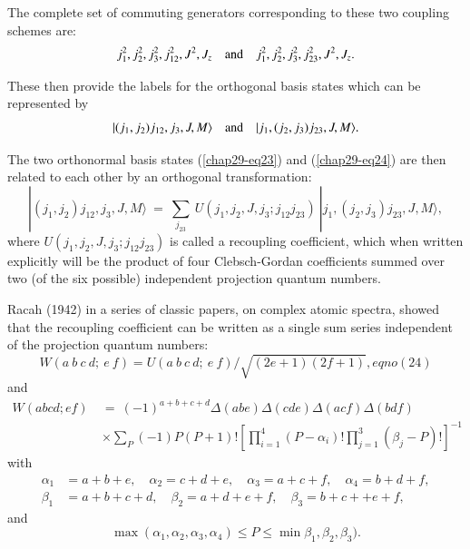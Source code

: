 The complete set of commuting generators corresponding to these two coupling schemes are:
\begin{equation}
j_1^2, j_2^2,j_3^2,j_{12}^2,J^2,J_z\quad {\rm and}\quad j_1^2, j_2^2,j_3^2,j_{23}^2,J^2,J_z. \label{chap29-eq23}
\end{equation}

These then provide the labels for the orthogonal basis states which can be represented by 
\begin{equation}
|(j_1,j_2)j_{12}, j_3, J, M\rangle  \quad {\rm and} \quad |j_1,(j_2,j_3)j_{23}, J, M\rangle. \label{chap29-eq24}
\end{equation}

The two orthonormal basis states (\eqref{chap29-eq23}) and (\eqref{chap29-eq24}) are then related to each other by an orthogonal transformation:
\begin{equation}
|(j_1,j_2)j_{12}, j_3, J, M\rangle \ =\ \sum_{j_{23}} \ U(j_1,j_2,J,j_3; j_{12}j_{23})\ |j_1,(j_2,j_3)j_{23}, J, M\rangle, \label{chap29-eq25}
\end{equation}
where $U(j_1,j_2,J,j_3; j_{12}j_{23})$ is called a recoupling coefficient, which when written explicitly will be the product of four Clebsch-Gordan coefficients summed over two (of the six possible) independent projection quantum numbers.

Racah (1942) in a series of classic papers, on complex atomic spectra, showed that the recoupling coefficient can be written as a single sum series independent of the projection quantum numbers:
\begin{equation*}
W(a\ b\ c\ d;\ e\ f) =  U(a\ b\ c\ d;\ e\ f) / \sqrt{(2e+1)(2f+1)}, eqno(24)
\end{equation*}
and
\begin{equation*}
\begin{split}
W(abcd;ef)\ & =\ (-1)^{a+b+c+d} \Delta(abe)\Delta(cde)\Delta(acf)\Delta(bdf) \\
 & \times\sum_P(-1)P (P+1)!\left[ \prod_{i=1}^4 (P-\alpha_i)! \prod_{j=1}^3 (\beta_j-P)! \right]^{-1} \label{chap29-eq25a}
\end{split}
\end{equation*}
with
\begin{equation}
\begin{split}
\alpha_1 & = a+b+e,\quad \alpha_2 = c+d+e, \quad \alpha_3 = a+c+f,\quad \alpha_4 = b+d+f,\\
\beta_1 & = a+b+c+d,\quad \beta_2 = a+d+e+f, \quad \beta_3 = b+c++e+f, \label{chap29-eq26}
\end{split}
\end{equation}
and 
\begin{equation}
\max(\alpha_1,\alpha_2,\alpha_3,\alpha_4)\leq P\leq \min\beta_1,\beta_2,\beta_3). \label{chap29-eq27}
\end{equation}

